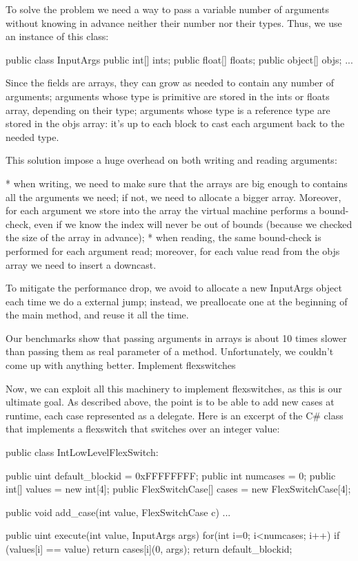 {To solve the problem we need a way to pass a variable number of arguments without knowing in advance neither their number nor their types. Thus, we use an instance of this class:

public class InputArgs {
public int[] ints;
public float[] floats;
public object[] objs;
...
}

Since the fields are arrays, they can grow as needed to contain any number of arguments; arguments whose type is primitive are stored in the ints or floats array, depending on their type; arguments whose type is a reference type are stored in the objs array: it's up to each block to cast each argument back to the needed type.

This solution impose a huge overhead on both writing and reading arguments:

        * when writing, we need to make sure that the arrays are big enough to contains all the arguments we need; if not, we need to allocate a bigger array. Moreover, for each argument we store into the array the virtual machine performs a bound-check, even if we know the index will never be out of bounds (because we checked the size of the array in advance);
        * when reading, the same bound-check is performed for each argument read; moreover, for each value read from the objs array we need to insert a downcast.

To mitigate the performance drop, we avoid to allocate a new InputArgs object each time we do a external jump; instead, we preallocate one at the beginning of the main method, and reuse it all the time.

Our benchmarks show that passing arguments in arrays is about 10 times slower than passing them as real parameter of a method. Unfortunately, we couldn't come up with anything better.
Implement flexswitches

Now, we can exploit all this machinery to implement flexswitches, as this is our ultimate goal. As described above, the point is to be able to add new cases at runtime, each case represented as a delegate. Here is an excerpt of the C# class that implements a flexswitch that switches over an integer value:

public class IntLowLevelFlexSwitch:
{
public uint default_blockid = 0xFFFFFFFF;
public int numcases = 0;
public int[] values = new int[4];
public FlexSwitchCase[] cases = new FlexSwitchCase[4];

public void add_case(int value, FlexSwitchCase c)
{
...
}

public uint execute(int value, InputArgs args)
{
for(int i=0; i<numcases; i++)
if (values[i] == value) {
 return cases[i](0, args);
}
return default_blockid;
}
}

}
